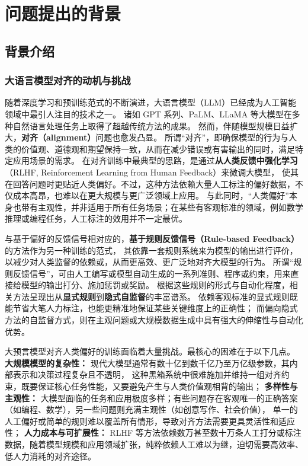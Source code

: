 \section{问题提出的背景}


\subsection{背景介绍}
\subsubsection{大语言模型对齐的动机与挑战}
随着深度学习和预训练范式的不断演进，大语言模型（LLM）已经成为人工智能领域中最引人注目的技术之一。
诸如 GPT 系列、PaLM、LLaMA 等大模型在多种自然语言处理任务上取得了超越传统方法的成果。
然而，伴随模型规模日益扩大，\textbf{对齐（alignment）}问题也愈发凸显。
所谓“对齐”，即确保模型的行为与人类的价值观、道德观和期望保持一致，从而在减少错误或有害输出的同时，满足特定应用场景的需求。
在对齐训练中最典型的思路，是通过\textbf{从人类反馈中强化学习}（RLHF, Reinforcement Learning from Human Feedback）来微调大模型，
使其在回答问题时更贴近人类偏好。不过，这种方法依赖大量人工标注的偏好数据，不仅成本高昂，也难以在更大规模与更广泛领域上应用。
与此同时，“人类偏好”本身也带有主观性，并非适用于所有任务场景；在某些有客观标准的领域，例如数学推理或编程任务，人工标注的效用并不一定最优。

与基于偏好的反馈信号相对应的，\textbf{基于规则反馈信号（Rule-based Feedback）}的方法作为另一种训练的范式，
其依靠一套规则系统来为模型的输出进行评价，以减少对人类监督的依赖或，从而更高效、更广泛地对齐大模型的行为。
所谓“规则反馈信号”，可由人工编写或模型自动生成的一系列准则、程序或约束，用来直接给模型的输出打分、施加惩罚或奖励。
根据这些规则的形式与自动化程度，相关方法呈现出从\textbf{显式规则}到\textbf{隐式自监督}的丰富谱系。
依赖客观标准的显式规则既能节省大笔人力标注，也能更精准地保证某些关键维度上的正确性；
而偏向隐式方法的自监督方式，则在主观问题或大规模数据生成中具有强大的伸缩性与自动化优势。

大预言模型对齐人类偏好的训练面临着大量挑战。最核心的困难在于以下几点。
\textbf{大规模模型的复杂性：}
现代大模型通常有数十亿到数千亿乃至万亿级参数，其内部表示和决策过程复杂且不透明，
这种黑箱系统中很难施加并维持一组对齐约束，既要保证核心任务性能，又要避免产生与人类价值观相背的输出；
\textbf{多样性与主观性：}
大模型面临的任务和应用极度多样；有些问题存在客观唯一的正确答案（如编程、数学），另一些问题则充满主观性（如创意写作、社会价值），
单一的人工偏好或简单的规则难以覆盖所有情形，导致对齐方法需要更具灵活性和适应性；
\textbf{人力成本与可扩展性：}
RLHF 等方法依赖数万甚至数十万条人工打分或标注数据，随着模型规模和应用领域扩张，纯粹依赖人工难以为继，迫切需要高效率、低人力消耗的对齐途径。

